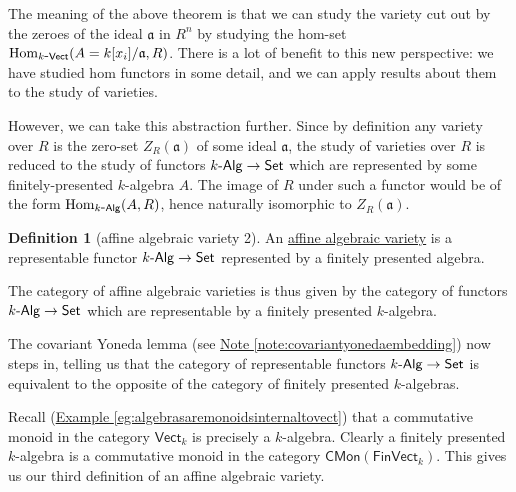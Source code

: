 \documentclass[a4paper,10pt]{scrreprt}
\newcommand{\defn}[1]{\ul{#1}}
\newcommand{\Hom}{\mathrm{Hom}}
\def\mhyp{{\hbox{-}}}
\theoremstyle{definition}
\newtheorem{definition}{Definition}[section]
\theoremstyle{plain}
\theoremstyle{remark}
\begin{document}
The meaning of the above theorem is that we can study the variety cut out by the zeroes of the ideal $\mathfrak{a}$ in $R^{n}$ by studying the hom-set $\Hom_{k\mhyp\mathsf{Vect}}(A = k[x_{i}]/\mathfrak{a}, R)$. There is a lot of benefit to this new perspective: we have studied hom functors in some detail, and we can apply results about them to the study of varieties.

However, we can take this abstraction further. Since by definition any variety over $R$ is the zero-set $Z_{R}(\mathfrak{a})$ of some ideal $\mathfrak{a}$, the study of varieties over $R$ is reduced to the study of functors $k\mhyp\mathsf{Alg} \to \mathsf{Set}$ which are represented by some finitely-presented $k$-algebra $A$. The image of $R$ under such a functor would be of the form $\Hom_{k\mhyp\mathsf{Alg}}(A, R)$, hence naturally isomorphic to $Z_{R}(\mathfrak{a})$.

\begin{definition}[affine algebraic variety 2]
  \label{def:affinealgebraicvariety2}
  An \defn{affine algebraic variety} is a representable functor $k\mhyp\mathsf{Alg} \to \mathsf{Set}$ represented by a finitely presented algebra. 
  
  The category of affine algebraic varieties is thus given by the category of functors $k\mhyp\mathsf{Alg} \to \mathsf{Set}$ which are representable by a finitely presented $k$-algebra.
\end{definition}

The covariant Yoneda lemma (see \hyperref[note:covariantyonedaembedding]{Note \ref*{note:covariantyonedaembedding}}) now steps in, telling us that the category of representable functors $k\mhyp\mathsf{Alg} \to \mathsf{Set}$ is equivalent to the opposite of the category of finitely presented $k$-algebras.

Recall (\hyperref[eg:algebrasaremonoidsinternaltovect]{Example \ref*{eg:algebrasaremonoidsinternaltovect}}) that a commutative monoid in the category $\mathsf{Vect}_{k}$ is precisely a $k$-algebra. Clearly a finitely presented $k$-algebra is a commutative monoid in the category $\mathsf{CMon}(\mathsf{FinVect}_{k})$. This gives us our third definition of an affine algebraic variety.
\end{document}
